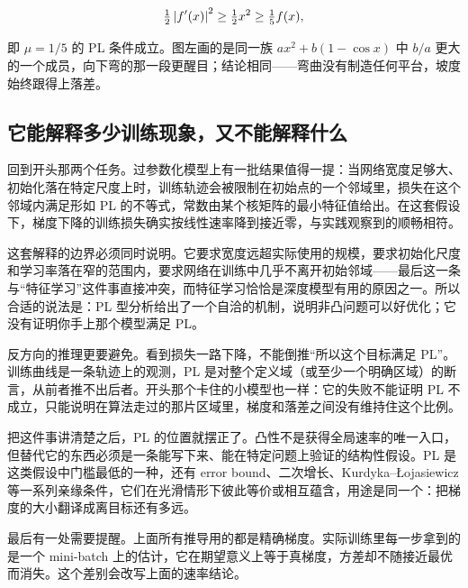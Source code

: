\[
\tfrac12\left|f'(x)\right|^2\ge\tfrac12x^2\ge\tfrac15 f(x),
\]

即 \(\mu=1/5\) 的 PL 条件成立。图左画的是同一族 \(ax^2+b(1-\cos x)\) 中 \(b/a\) 更大的一个成员，向下弯的那一段更醒目；结论相同——弯曲没有制造任何平台，坡度始终跟得上落差。

\subsection{它能解释多少训练现象，又不能解释什么}

回到开头那两个任务。过参数化模型上有一批结果值得一提：当网络宽度足够大、初始化落在特定尺度上时，训练轨迹会被限制在初始点的一个邻域里，损失在这个邻域内满足形如 PL 的不等式，常数由某个核矩阵的最小特征值给出。在这套假设下，梯度下降的训练损失确实按线性速率降到接近零，与实践观察到的顺畅相符。

这套解释的边界必须同时说明。它要求宽度远超实际使用的规模，要求初始化尺度和学习率落在窄的范围内，要求网络在训练中几乎不离开初始邻域——最后这一条与``特征学习''这件事直接冲突，而特征学习恰恰是深度模型有用的原因之一。所以合适的说法是：PL 型分析给出了一个自洽的机制，说明非凸问题可以好优化；它没有证明你手上那个模型满足 PL。

反方向的推理更要避免。看到损失一路下降，不能倒推``所以这个目标满足 PL''。训练曲线是一条轨迹上的观测，PL 是对整个定义域（或至少一个明确区域）的断言，从前者推不出后者。开头那个卡住的小模型也一样：它的失败不能证明 PL 不成立，只能说明在算法走过的那片区域里，梯度和落差之间没有维持住这个比例。

把这件事讲清楚之后，PL 的位置就摆正了。凸性不是获得全局速率的唯一入口，但替代它的东西必须是一条能写下来、能在特定问题上验证的结构性假设。PL 是这类假设中门槛最低的一种，还有 error bound、二次增长、Kurdyka--\L{}ojasiewicz 等一系列亲缘条件，它们在光滑情形下彼此等价或相互蕴含，用途是同一个：把梯度的大小翻译成离目标还有多远。

最后有一处需要提醒。上面所有推导用的都是精确梯度。实际训练里每一步拿到的是一个 mini-batch 上的估计，它在期望意义上等于真梯度，方差却不随接近最优而消失。这个差别会改写上面的速率结论。
